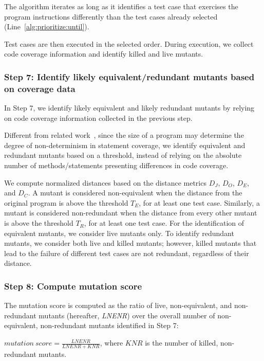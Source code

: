 The algorithm iterates as long as it identifies a test case that exercises 
the program instructions differently than the test cases already selected (Line~\ref{alg:prioritize:until}).

Test cases are then executed in the selected order. During  execution, we collect code coverage information and identify killed and live mutants.



\subsubsection{Step 7: Identify likely equivalent/redundant mutants based on coverage data}
\label{sec:algostepSeven}


In Step 7, we identify likely equivalent and likely redundant mutants by relying on code coverage information  {collected in the previous step}.

Different from related work~\cite{schuler2013covering}, since the size of a program may determine the degree of non-determinism in statement coverage, 
we identify equivalent and redundant mutants based on a threshold, instead of relying on the absolute number of methods/statements presenting differences in code coverage. 

We compute normalized distances based on the distance metrics $D_J$, $D_O$, $D_E$, and $D_C$. A mutant is considered non-equivalent when the distance from the original program is above the threshold $T_E$, for at least one test case.
Similarly, a mutant is considered non-redundant when the distance from every other mutant is above the threshold $T_R$, for at least one test case. For the identification of equivalent mutants, we consider live mutants only. To identify redundant mutants, we consider both live and killed mutants; however, killed mutants that lead to the failure of different test cases are not redundant, regardless of their distance.

\subsubsection{Step 8: Compute mutation score}
\label{sec:appr:score}

The mutation score is computed as the ratio of live, non-equivalent, and non-redundant mutants (hereafter, \emph{LNENR}) over the overall number of non-equivalent, non-redundant mutants identified in Step 7:

$\mathit{mutation}\ \mathit{score} = \frac{\mathit{LNENR}}{\mathit{LNENR}+\mathit{KNR}}$,
where $\mathit{KNR}$ is the number of killed, non-redundant mutants.

%
%
%
